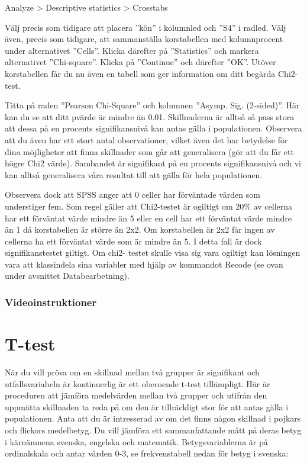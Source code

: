 \documentclass[
]{book}
\begin{document}
Analyze \textgreater{} Descriptive statistics \textgreater{} Crosstabs

Välj precis som tidigare att placera ''kön'' i kolumnled och ''S4'' i radled. Välj även, precis som tidigare,
att sammanställa korstabellen med kolumnprocent under alternativet ''Cells''. Klicka därefter på
''Statistics'' och markera alternativet ''Chi-square''. Klicka på ''Continue'' och därefter ''OK''. Utöver korstabellen får du nu även en tabell som ger
information om ditt begärda Chi2-test.

Titta på raden ''Pearson Chi-Square'' och kolumnen ''Asymp. Sig. (2-sided)''. Här kan du se att ditt pvärde
är mindre än 0.01. Skillnaderna är alltså så pass stora att dessa på en procents signifikansnivå kan
antas gälla i populationen. Observera att du även har ett stort antal observationer, vilket även det har
betydelse för dina möjligheter att finna skillnader som går att generalisera (gör att du får ett högre Chi2
värde). Sambandet är signifikant på en procents signifikansnivå och vi kan alltså generalisera våra
resultat till att gälla för hela populationen.

Observera dock att SPSS anger att 0 celler har förväntade värden som understiger fem. Som regel gäller
att Chi2-testet är ogiltigt om 20\% av cellerna har ett förväntat värde mindre än 5 eller en cell har ett
förväntat värde mindre än 1 då korstabellen är större än 2x2. Om korstabellen är 2x2 får ingen av
cellerna ha ett förväntat värde som är mindre än 5. I detta fall är dock signifikanstestet giltigt. Om chi2-
testet skulle visa sig vara ogiltigt kan lösningen vara att klassindela sina variabler med hjälp av
kommandot Recode (se ovan under avsnittet Databearbetning).

\hypertarget{videoinstruktioner-8}{%
\subsection{Videoinstruktioner}\label{videoinstruktioner-8}}

\hypertarget{t-test}{%
\chapter{T-test}\label{t-test}}

När du vill pröva om en skillnad mellan två grupper är signifikant och utfallsvariabeln är kontinuerlig är
ett oberoende t-test tillämpligt. Här är proceduren att jämföra medelvärden mellan två grupper och
utifrån den uppmätta skillnaden ta reda på om den är tillräckligt stor för att antas gälla i populationen.
Anta att du är intresserad av om det finns någon skillnad i pojkars och flickors medelbetyg. Du vill
jämföra ett sammanfattande mått på deras betyg i kärnämnena svenska, engelska och matematik.
Betygsvariablerna är på ordinalskala och antar värden 0-3, se frekvenstabell nedan för betyg i
svenska:
\end{document}
